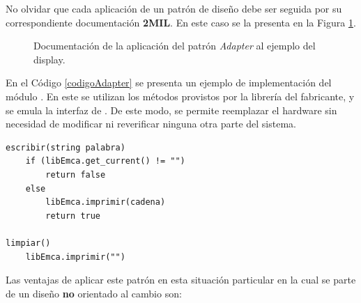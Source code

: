 No olvidar que cada aplicación de un patrón de diseño debe ser seguida por su correspondiente documentación \textbf{2MIL}. En este caso se la presenta en la Figura \ref{docAdapter}.

\begin{figure}[H]
\caption{Documentación de la aplicación del patrón \textit{Adapter} al ejemplo del display.}
\label{docAdapter}
\end{figure}


En el Código \ref{codigoAdapter} se presenta un ejemplo de implementación del módulo \DisplayEmca. En este se utilizan los métodos provistos por la librería del fabricante, y se emula la interfaz de \Display. De este modo, se permite reemplazar el hardware sin necesidad de modificar ni reverificar ninguna otra parte del sistema.
\newpage
\begin{lstlisting}[label={codigoAdapter}, caption=Ejemplo de implementación del módulo \ControlEmca]
escribir(string palabra)
    if (libEmca.get_current() != "")
        return false
    else
        libEmca.imprimir(cadena)
        return true

limpiar()
    libEmca.imprimir("")
\end{lstlisting}

Las ventajas de aplicar este patrón en esta situación particular en la cual se parte de un diseño \textbf{no} orientado al cambio son:

